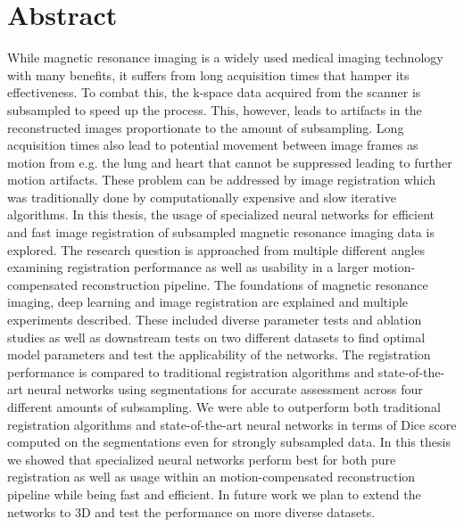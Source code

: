 \chapter*{Abstract}
While magnetic resonance imaging is a widely used medical imaging technology with many benefits, it suffers from long acquisition times that hamper its effectiveness. 
To combat this, the k-space data acquired from the scanner is subsampled to speed up the process. 
This, however, leads to artifacts in the reconstructed images proportionate to the amount of subsampling.
Long acquisition times also lead to potential movement between image frames as motion from e.g. the lung and heart that cannot be suppressed leading to further motion artifacts. These problem can be addressed by image registration which was traditionally done by computationally expensive and slow iterative algorithms. In this thesis, the usage of specialized neural networks for efficient and fast image registration of subsampled magnetic resonance imaging data is explored. The research question is approached from multiple different angles examining registration performance as well as usability in a larger motion-compensated reconstruction pipeline. The foundations of magnetic resonance imaging, deep learning and image registration are explained and multiple experiments described. These included diverse parameter tests and ablation studies as well as downstream tests on two different datasets to find optimal model parameters and test the applicability of the networks. The registration performance is compared to traditional registration algorithms and state-of-the-art neural networks using segmentations for accurate assessment across four different amounts of subsampling. We were able to outperform both traditional registration algorithms and state-of-the-art neural networks in terms of Dice score computed on the segmentations even for strongly subsampled data. In this thesis we showed that specialized neural networks perform best for both pure registration as well as usage within an motion-compensated reconstruction pipeline while being fast and efficient. In future work we plan to extend the networks to 3D and test the performance on more diverse datasets.

